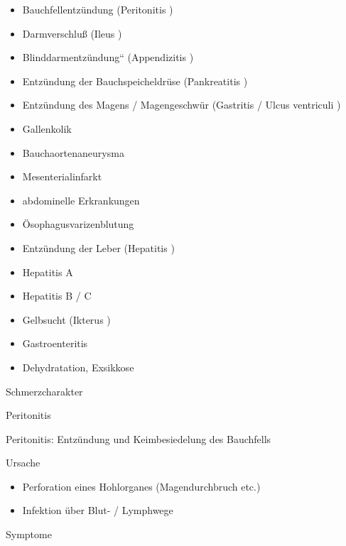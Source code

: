 \documentclass{article}
\begin{document}
\begin{itemize}
\item Bauchfellentz\"undung (Peritonitis )

\item Darmverschlu{\ss} (Ileus )

\item {\quotedblbase}Blinddarmentz\"undung{\textquotedblleft}
(Appendizitis )

\item Entz\"undung der Bauchspeicheldr\"use  (Pankreatitis )

\item Entz\"undung des Magens / Magengeschw\"ur  (Gastritis / Ulcus
ventriculi )

\item Gallenkolik

\item Bauchaortenaneurysma

\item Mesenterialinfarkt

\item abdominelle Erkrankungen

\item \"Osophagusvarizenblutung

\item Entz\"undung der Leber (Hepatitis )

\end{itemize}
\begin{itemize}
\item Hepatitis A

\item Hepatitis B / C

\end{itemize}
\begin{itemize}
\item Gelbsucht (Ikterus )

\item Gastroenteritis

\item Dehydratation, Exsikkose

\end{itemize}
Schmerzcharakter

Peritonitis

Peritonitis: Entz\"undung und Keimbesiedelung des  Bauchfells

Ursache

\begin{itemize}
\item Perforation eines Hohlorganes  (Magendurchbruch etc.)

\item Infektion \"uber Blut- / Lymphwege

\end{itemize}
Symptome
\end{document}
